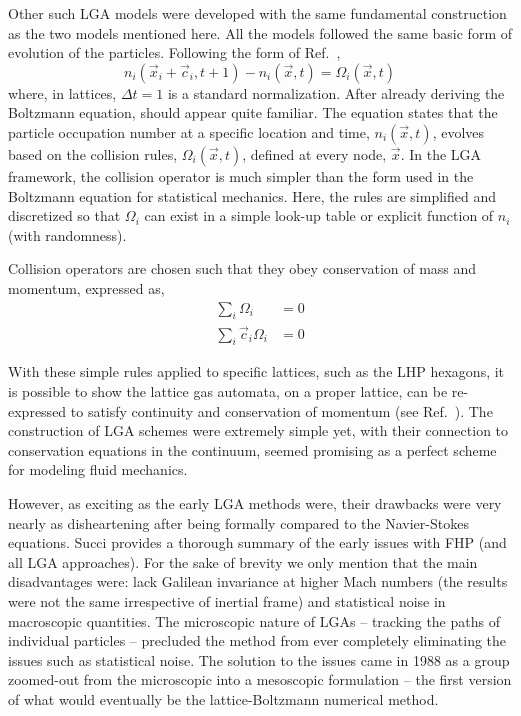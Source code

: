 Other such LGA models were developed with the same fundamental construction as the two models mentioned here. All the models followed the same basic form of evolution of the particles. Following the form of Ref.~\cite{chopard1998cellular},
\begin{equation}\label{eq:lattice-evolution}
	n_i(\vec{x}_i + \vec{c}_i,t+1) - n_i(\vec{x},t) = \Omega_i(\vec{x},t)
\end{equation}
where, in lattices, $\Delta t = 1$ is a standard normalization. After already deriving the Boltzmann equation,  should appear quite familiar. The equation states that the particle occupation number at a specific location and time, $n_i(\vec{x},t)$, evolves based on the collision rules, $\Omega_i(\vec{x},t)$, defined at every node, $\vec{x}$. In the LGA framework, the collision operator is much simpler than the form used in the Boltzmann equation for statistical mechanics. Here, the rules are simplified and discretized so that $\Omega_i$ can exist in a simple look-up table or explicit function of $n_i$ (with randomness).\cite{chopard1998cellular,Sukop2007}

Collision operators are chosen such that they obey conservation of mass and momentum, expressed as,
\begin{subequations}
\begin{align}
	\sum_i\Omega_i &= 0\\
	\sum_i\vec{c}_i\Omega_i&=0
\end{align}
\end{subequations}

With these simple rules applied to specific lattices, such as the LHP hexagons, it is possible to show the lattice gas automata, on a proper lattice, can be re-expressed to satisfy continuity and conservation of momentum (see Ref.~\cite{Viggen2009,Frisch1986}). The construction of LGA schemes were extremely simple yet, with their connection to conservation equations in the continuum, seemed promising as a perfect scheme for modeling fluid mechanics.

However, as exciting as the early LGA methods were, their drawbacks were very nearly as disheartening after being formally compared to the Navier-Stokes equations. Succi provides a thorough summary of the early issues with FHP (and all LGA approaches).\cite{succi2001lattice} For the sake of brevity we only mention that the main disadvantages were: lack Galilean invariance at higher Mach numbers (the results were not the same irrespective of inertial frame) and statistical noise in macroscopic quantities. The microscopic nature of LGAs -- tracking the paths of individual particles -- precluded the method from ever completely eliminating the issues such as statistical noise. The solution to the issues came in 1988 as a group zoomed-out from the microscopic into a mesoscopic formulation -- the first version of what would eventually be the lattice-Boltzmann numerical method.




